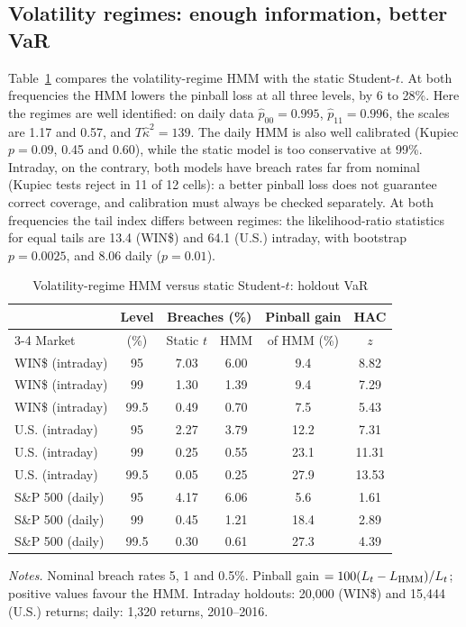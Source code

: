 \documentclass[12pt,letterpaper]{article}
\theoremstyle{plain}
\theoremstyle{remark}
\begin{document}
\subsection{Volatility regimes: enough information, better VaR}
Table~\ref{tab:var} compares the volatility-regime HMM with the static Student-$t$. At both frequencies the HMM lowers the pinball loss at all three levels, by 6 to 28\%. Here the regimes are well identified: on daily data $\hat p_{00}=0.995$, $\hat p_{11}=0.996$, the scales are 1.17 and 0.57, and $T\hat\kappa^2=139$. The daily HMM is also well calibrated (Kupiec $p=0.09$, 0.45 and 0.60), while the static model is too conservative at 99\%. Intraday, on the contrary, both models have breach rates far from nominal (Kupiec tests reject in 11 of 12 cells): a better pinball loss does not guarantee correct coverage, and calibration must always be checked separately. At both frequencies the tail index differs between regimes: the likelihood-ratio statistics for equal tails are 13.4 (WIN\$) and 64.1 (U.S.) intraday, with bootstrap $p=0.0025$, and 8.06 daily ($p=0.01$).

\begin{table}[ht]
\centering\small
\caption{Volatility-regime HMM versus static Student-$t$: holdout VaR}\label{tab:var}
\begin{tabular}{lccccc}
\toprule
 & Level & \multicolumn{2}{c}{Breaches (\%)} & Pinball gain & HAC\\
\cmidrule(lr){3-4}
Market & (\%) & Static $t$ & HMM & of HMM (\%) & $z$\\
\midrule
WIN\$ (intraday) & 95 & 7.03 & 6.00 & 9.4 & 8.82\\
WIN\$ (intraday) & 99 & 1.30 & 1.39 & 9.4 & 7.29\\
WIN\$ (intraday) & 99.5 & 0.49 & 0.70 & 7.5 & 5.43\\
U.S. (intraday) & 95 & 2.27 & 3.79 & 12.2 & 7.31\\
U.S. (intraday) & 99 & 0.25 & 0.55 & 23.1 & 11.31\\
U.S. (intraday) & 99.5 & 0.05 & 0.25 & 27.9 & 13.53\\
S\&P 500 (daily) & 95 & 4.17 & 6.06 & 5.6 & 1.61\\
S\&P 500 (daily) & 99 & 0.45 & 1.21 & 18.4 & 2.89\\
S\&P 500 (daily) & 99.5 & 0.30 & 0.61 & 27.3 & 4.39\\
\bottomrule
\end{tabular}
\par\smallskip\footnotesize\emph{Notes.} Nominal breach rates 5, 1 and 0.5\%. Pinball gain $=100(L_t-L_{\rm HMM})/L_t$; positive values favour the HMM. Intraday holdouts: 20{,}000 (WIN\$) and 15{,}444 (U.S.) returns; daily: 1{,}320 returns, 2010--2016.
\end{table}
\end{document}
